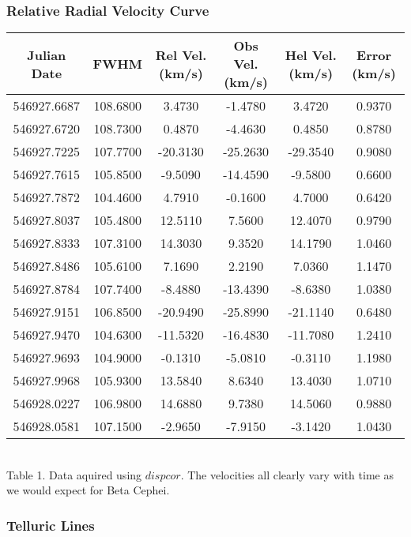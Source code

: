 \documentclass{article}
\begin{document}
\subsubsection{Relative Radial Velocity Curve}
\begin{tabular}{|c|c|c|c|c|c|}
\hline
Julian Date & FWHM & Rel Vel. (km/s) & Obs Vel. (km/s) & Hel Vel. (km/s) & Error (km/s)\\
\hline
546927.6687 & 108.6800 & 3.4730 & -1.4780 & 3.4720 & 0.9370\\
546927.6720 & 108.7300 & 0.4870 & -4.4630 & 0.4850 & 0.8780\\
546927.7225 & 107.7700 & -20.3130 & -25.2630 & -29.3540 & 0.9080\\
546927.7615 & 105.8500 & -9.5090 &-14.4590 &-9.5800 & 0.6600\\
546927.7872 & 104.4600 & 4.7910 & -0.1600 & 4.7000 & 0.6420\\
546927.8037 & 105.4800 & 12.5110 & 7.5600 & 12.4070 & 0.9790\\
546927.8333 & 107.3100 & 14.3030 & 9.3520 & 14.1790 & 1.0460\\
546927.8486 & 105.6100 & 7.1690 & 2.2190 & 7.0360 & 1.1470\\
546927.8784 & 107.7400 & -8.4880 & -13.4390 & -8.6380 & 1.0380\\
546927.9151 & 106.8500 & -20.9490 & -25.8990 & -21.1140 & 0.6480\\
546927.9470 & 104.6300 & -11.5320 & -16.4830 & -11.7080 & 1.2410\\
546927.9693 & 104.9000 & -0.1310 &-5.0810 & -0.3110 & 1.1980\\
546927.9968 & 105.9300 & 13.5840 & 8.6340 & 13.4030 & 1.0710\\
546928.0227 & 106.9800 & 14.6880 & 9.7380 & 14.5060 & 0.9880\\
546928.0581 & 107.1500 & -2.9650 & -7.9150 & -3.1420 & 1.0430\\

\hline
\end{tabular}\\

Table 1. Data aquired using $dispcor$. The velocities all clearly vary with time as we would expect for Beta Cephei. 
\subsubsection{Telluric Lines}
\end{document}
